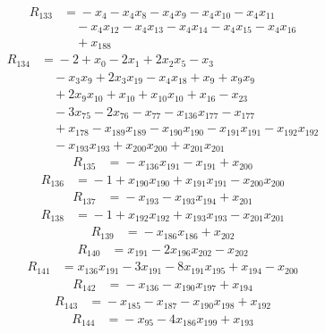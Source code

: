 \begin{align*}
R_{133}&={}-x_{4} -x_{4}x_{8} -x_{4}x_{9} -x_{4}x_{10} -x_{4}x_{11}\\
&\quad{}-x_{4}x_{12} -x_{4}x_{13} -x_{4}x_{14} -x_{4}x_{15} -x_{4}x_{16}\\
&\quad{}+x_{188}
\end{align*}
\begin{align*}
R_{134}&={}-2 +x_{0} -2x_{1} +2x_{2}x_{5} -x_{3}\\
&\quad{}-x_{3}x_{9} +2x_{3}x_{19} -x_{4}x_{18} +x_{9} +x_{9}x_{9}\\
&\quad{}+2x_{9}x_{10} +x_{10} +x_{10}x_{10} +x_{16} -x_{23}\\
&\quad{}-3x_{75} -2x_{76} -x_{77} -x_{136}x_{177} -x_{177}\\
&\quad{}+x_{178} -x_{189}x_{189} -x_{190}x_{190} -x_{191}x_{191} -x_{192}x_{192}\\
&\quad{}-x_{193}x_{193} +x_{200}x_{200} +x_{201}x_{201}
\end{align*}
\begin{align*}
R_{135}&={}-x_{136}x_{191} -x_{191} +x_{200}
\end{align*}
\begin{align*}
R_{136}&={}-1 +x_{190}x_{190} +x_{191}x_{191} -x_{200}x_{200}
\end{align*}
\begin{align*}
R_{137}&={}-x_{193} -x_{193}x_{194} +x_{201}
\end{align*}
\begin{align*}
R_{138}&={}-1 +x_{192}x_{192} +x_{193}x_{193} -x_{201}x_{201}
\end{align*}
\begin{align*}
R_{139}&={}-x_{186}x_{186} +x_{202}
\end{align*}
\begin{align*}
R_{140}&={}x_{191} -2x_{196}x_{202} -x_{202}
\end{align*}
\begin{align*}
R_{141}&={}x_{136}x_{191} -3x_{191} -8x_{191}x_{195} +x_{194} -x_{200}
\end{align*}
\begin{align*}
R_{142}&={}-x_{136} -x_{190}x_{197} +x_{194}
\end{align*}
\begin{align*}
R_{143}&={}-x_{185} -x_{187} -x_{190}x_{198} +x_{192}
\end{align*}
\begin{align*}
R_{144}&={}-x_{95} -4x_{186}x_{199} +x_{193}
\end{align*}
